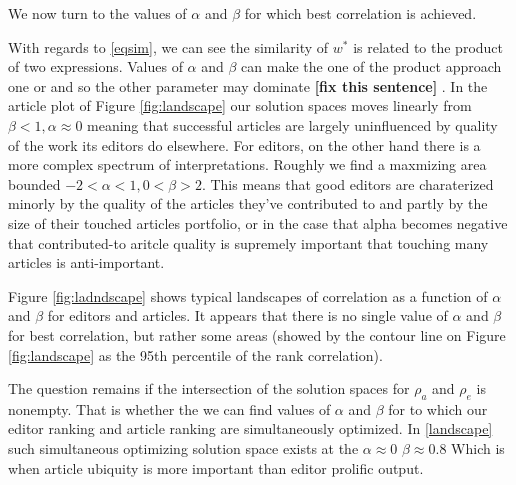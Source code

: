 We now turn to the values of $\alpha$ and $\beta$ for which best correlation is achieved.  

With regards to \eqref{eqsim}, we can see the similarity of $w^*$ is related to the product of two expressions. Values of $\alpha$ and $\beta$ can make the one of the product approach one or and so the other parameter may dominate {\bf [fix this sentence]} . In the article plot of Figure \ref{fig:landscape} our solution spaces moves linearly from $ \beta < 1 , \alpha \approx 0$ meaning that successful articles are largely uninfluenced by quality of the work its editors do elsewhere. For editors, on the other hand there is a more complex spectrum of interpretations. Roughly we find a maxmizing area bounded $ -2  <\alpha < 1 , 0 < \beta > 2 $. This means that good editors are charaterized minorly by the quality of the articles they've contributed to and partly by the size of their touched articles portfolio, or in the case that alpha becomes negative that contributed-to aritcle quality is supremely important that touching many articles is anti-important.


Figure \ref{fig:ladndscape} shows typical landscapes of correlation as a function of $\alpha$ and $\beta$ for editors and articles. It appears that there is no single value of $\alpha$ and $\beta$ for best correlation, but rather some areas (showed by the contour line on Figure \ref{fig:landscape} as the 95th percentile of the rank correlation).

The question remains if the intersection of the solution spaces for $\rho_a$ and $\rho_e$ is nonempty. That is whether the we can find values of $\alpha$ and $\beta$ for to which our editor ranking and article ranking are simultaneously optimized. In \ref{landscape} such simultaneous optimizing solution space exists at the $\alpha \approx 0$ $\beta \approx 0.8$ Which is when article ubiquity is more important than editor prolific output.

